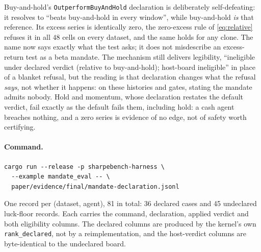Buy-and-hold's \texttt{OutperformBuyAndHold} declaration is deliberately self-defeating: it resolves to ``beats buy-and-hold in every window'', while buy-and-hold \emph{is} that reference. Its excess series is identically zero, the zero-excess rule of \cref{eq:relative} refuses it in all $48$ cells on every dataset, and the same holds for any clone. The name now says exactly what the test asks; it does not misdescribe an excess-return test as a beta mandate. The mechanism still delivers legibility, ``ineligible under declared verdict (relative to buy-and-hold); host-board ineligible'' in place of a blanket refusal, but the reading is that declaration changes what the refusal \emph{says}, not whether it happens: on these histories and gates, stating the mandate admits nobody. Hold and momentum, whose declaration restates the default verdict, fail exactly as the default fails them, including hold: a cash agent breaches nothing, and a zero series is evidence of no edge, not of safety worth certifying.

\paragraph{Command.}
\begin{verbatim}
cargo run --release -p sharpebench-harness \
  --example mandate_eval -- \
  paper/evidence/final/mandate-declaration.jsonl
\end{verbatim}
One record per (dataset, agent), 81 in total: 36 declared cases and 45 undeclared luck-floor records. Each carries the command, declaration, applied verdict and both eligibility columns. The declared columns are produced by the kernel's own \texttt{rank\_declared}, not by a reimplementation, and the host-verdict columns are byte-identical to the undeclared board.

